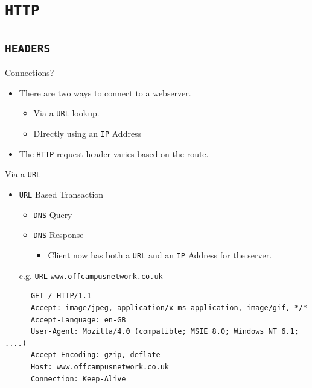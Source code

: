 \documentclass[xcolor=table]{beamer}
\begin{document}
\section{\texttt{HTTP}}
\subsection{\texttt{HEADERS}}
\begin{frame}{Connections?}
  \begin{itemize}
    \item There are two ways to connect to a webserver.
      \begin{itemize}
        \item Via a \texttt{URL} lookup.
        \item DIrectly using an \texttt{IP} Address
      \end{itemize}
    \item The \texttt{HTTP} request header varies based on the route.
  \end{itemize}
\end{frame}

\begin{frame}[fragile]{Via a \texttt{URL}}
  \begin{itemize}
      \item \texttt{URL} Based Transaction
      \begin{itemize}
        \item \texttt{DNS} Query
        \item \texttt{DNS} Response
          \begin{itemize}
            \item Client now has both a \texttt{URL} and an \texttt{IP} Address for the server.
          \end{itemize}
      \end{itemize}
      \begin{center}
        e.g. \texttt{URL} \texttt{www.offcampusnetwork.co.uk}        
      \end{center}
    \end{itemize}
  \begin{tcolorbox}
    \lstset{
      basicstyle=\tiny\ttfamily,
    }
    \begin{lstlisting}
      GET / HTTP/1.1
      Accept: image/jpeg, application/x-ms-application, image/gif, */*
      Accept-Language: en-GB
      User-Agent: Mozilla/4.0 (compatible; MSIE 8.0; Windows NT 6.1; ....)
      Accept-Encoding: gzip, deflate
      Host: www.offcampusnetwork.co.uk
      Connection: Keep-Alive
    \end{lstlisting}
  \end{tcolorbox}
\end{frame}
\end{document}
